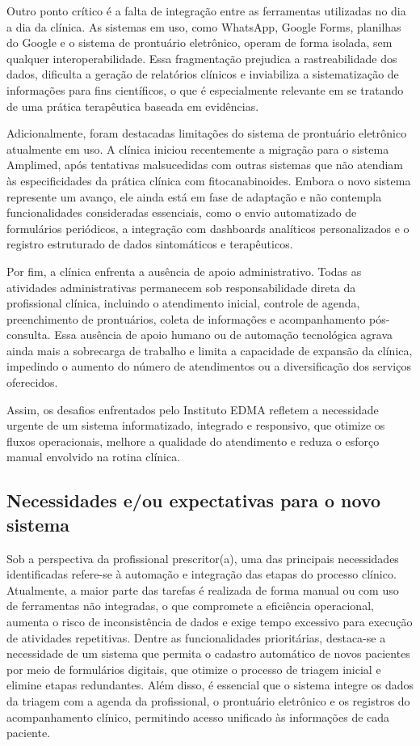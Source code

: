 \href{}{}\documentclass[12pt,portuguese,oneside]{article}
\begin{document}
Outro ponto crítico é a falta de integração entre as ferramentas utilizadas no dia a dia da clínica. As sistemas em uso, como WhatsApp, Google Forms, planilhas do Google e o sistema de prontuário eletrônico, operam de forma isolada, sem qualquer interoperabilidade. Essa fragmentação prejudica a rastreabilidade dos dados, dificulta a geração de relatórios clínicos e inviabiliza a sistematização de informações para fins científicos, o que é especialmente relevante em se tratando de uma prática terapêutica baseada em evidências.

Adicionalmente, foram destacadas limitações do sistema de prontuário eletrônico atualmente em uso. A clínica iniciou recentemente a migração para o sistema Amplimed, após tentativas malsucedidas com outras sistemas que não atendiam às especificidades da prática clínica com fitocanabinoides. Embora o novo sistema represente um avanço, ele ainda está em fase de adaptação e não contempla funcionalidades consideradas essenciais, como o envio automatizado de formulários periódicos, a integração com dashboards analíticos personalizados e o registro estruturado de dados sintomáticos e terapêuticos.

Por fim, a clínica enfrenta a ausência de apoio administrativo. Todas as atividades administrativas permanecem sob responsabilidade direta da profissional clínica, incluindo o atendimento inicial, controle de agenda, preenchimento de prontuários, coleta de informações e acompanhamento pós-consulta. Essa ausência de apoio humano ou de automação tecnológica agrava ainda mais a sobrecarga de trabalho e limita a capacidade de expansão da clínica, impedindo o aumento do número de atendimentos ou a diversificação dos serviços oferecidos.

Assim, os desafios enfrentados pelo Instituto EDMA refletem a necessidade urgente de um sistema informatizado, integrado e responsivo, que otimize os fluxos operacionais, melhore a qualidade do atendimento e reduza o esforço manual envolvido na rotina clínica.


\subsection{Necessidades e/ou expectativas para o novo sistema}

\hspace{1em} Sob a perspectiva da profissional prescritor(a), uma das principais necessidades identificadas refere-se à automação e integração das etapas do processo clínico. Atualmente, a maior parte das tarefas é realizada de forma manual ou com uso de ferramentas não integradas, o que compromete a eficiência operacional, aumenta o risco de inconsistência de dados e exige tempo excessivo para execução de atividades repetitivas. Dentre as funcionalidades prioritárias, destaca-se a necessidade de um sistema que permita o cadastro automático de novos pacientes por meio de formulários digitais, que otimize o processo de triagem inicial e elimine etapas redundantes. Além disso, é essencial que o sistema integre os dados da triagem com a agenda da profissional, o prontuário eletrônico e os registros do acompanhamento clínico, permitindo acesso unificado às informações de cada paciente.
\end{document}
